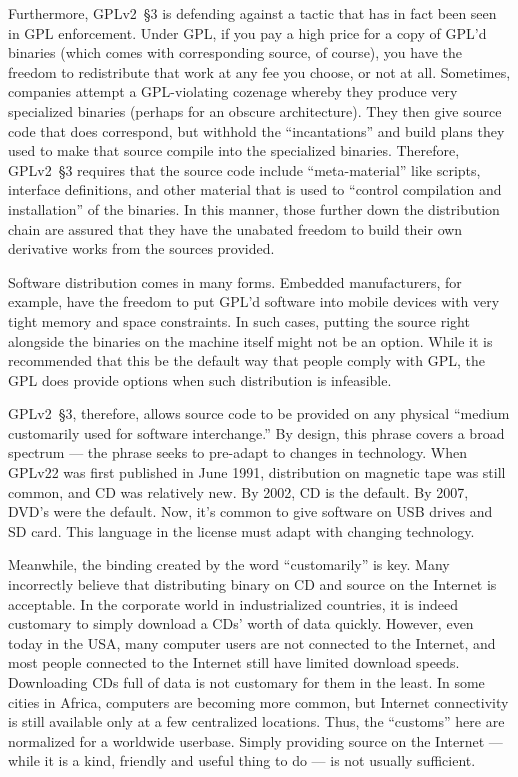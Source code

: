 Furthermore, GPLv2~\S3 is defending against a tactic that has in fact been
seen in GPL enforcement.  Under GPL, if you pay a high price for
a copy of GPL'd binaries (which comes with corresponding source, of
course), you have the freedom to redistribute that work at any fee you
choose, or not at all.  Sometimes, companies attempt a GPL-violating
cozenage whereby they produce very specialized binaries (perhaps for
an obscure architecture).  They then give source code that does
correspond, but withhold the ``incantations'' and build plans they
used to make that source compile into the specialized binaries.
Therefore, GPLv2~\S3 requires that the source code include ``meta-material'' like
scripts, interface definitions, and other material that is used to
``control compilation and installation'' of the binaries.  In this
manner, those further down the distribution chain are assured that
they have the unabated freedom to build their own derivative works
from the sources provided.

Software distribution comes in many
forms.  Embedded manufacturers, for example, have the freedom to put
GPL'd software into mobile devices with very tight memory and space
constraints.  In such cases, putting the source right alongside the
binaries on the machine itself might not be an option.  While it is
recommended that this be the default way that people comply with GPL, the
GPL does provide options when such distribution is infeasible.

\label{GPLv2s3-medium-customarily}
GPLv2~\S3, therefore, allows source code to be provided on any physical
``medium customarily used for software interchange.''  By design, this
phrase covers a broad spectrum --- the phrase seeks to pre-adapt to
changes in  technology.  When GPLv22 was first published in June
1991, distribution on magnetic tape was still common, and CD was
relatively new.  By 2002, CD is the default.  By 2007, DVD's were the
default.  Now, it's common to give software on USB drives and SD card.  This
language in the license must adapt with changing technology.

Meanwhile, the binding created by the word ``customarily'' is key.  Many
incorrectly believe that distributing binary on CD and source on the
Internet is acceptable.  In the corporate world in industrialized countries, it is indeed customary to
simply download a CDs' worth of data quickly.  However, even today in the USA, many computer users are not connected to the Internet, and most people connected
to the Internet still have limited download speeds.  Downloading
CDs full of data is not customary for them in the least.  In some cities
in Africa, computers are becoming more common, but Internet connectivity
is still available only at a few centralized locations.  Thus, the
``customs'' here are normalized for a worldwide userbase.  Simply
providing source on the Internet --- while it is a kind, friendly and
useful thing to do --- is not usually sufficient.

